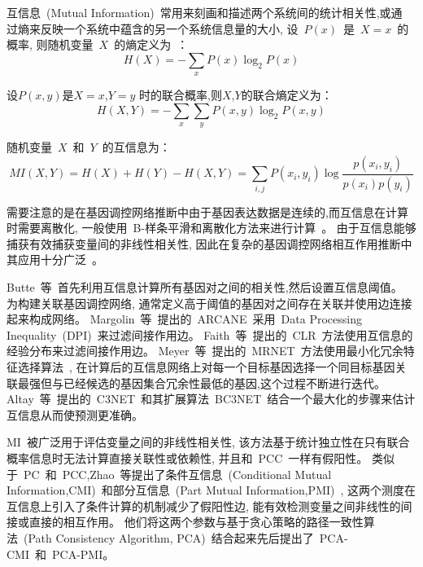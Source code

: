 \begin{enumerate}
互信息~(Mutual Information)~常用来刻画和描述两个系统间的统计相关性,或通
过熵来反映一个系统中蕴含的另一个系统信息量的大小, 设~$P(x)$~是~$X=x$~的概率,
则随机变量~$X$~的熵定义为~\cite{cover2012elements}：
\begin{equation}
H(X) = - \sum\limits_x {P(x)\log _2 P(x)} 
\end{equation}

设$P(x,y)$是$X=x$,$Y=y$ 时的联合概率,则$X$,$Y$的联合熵定义为：
\begin{equation}
H(X,Y) =  - \sum\limits_x {\sum\limits_y {P(x,y)\log _2 P(x,y)} } 
\end{equation}

随机变量~$X$~和~$Y$~的互信息为：
\begin{equation}
MI(X,Y) = H(X) + H(Y) - H(X,Y) = \sum\limits_{i,j} {P(x_i ,y_i )\log \frac{{p(x_i,y_i )}}{{p(x_i )p(y_i )}}} 
\end{equation}

需要注意的是在基因调控网络推断中由于基因表达数据是连续的,而互信息在计算时需要离散化,
一般使用~B-样条平滑和离散化方法来进行计算~\cite{daub2004estimating}。
由于互信息能够捕获有效捕获变量间的非线性相关性,
因此在复杂的基因调控网络相互作用推断中其应用十分广泛~\cite{brunel2010miss,zhang2011inferring}。

Butte~等~\cite{basso2005reverse}首先利用互信息计算所有基因对之间的相关性,然后设置互信息阈值。
为构建关联基因调控网络, 通常定义高于阈值的基因对之间存在关联并使用边连接起来构成网络。
Margolin~等~\cite{margolin2006aracne}提出的~ARCANE~采用~Data Processing Inequality~(DPI)~来过滤间接作用边。
Faith~等~\cite{faith2007large}提出的~CLR~方法使用互信息的经验分布来过滤间接作用边。
Meyer~等~\cite{meyer2007information}提出的~MRNET~方法使用最小化冗余特征选择算法~\cite{peng2005feature},
在计算后的互信息网络上对每一个目标基因选择一个同目标基因关联最强但与已经候选的基因集合冗余性最低的基因,这个过程不断进行迭代。
Altay~等~\cite{altay2010inferring}提出的~C3NET~和其扩展算法~BC3NET~\cite{de2012bagging}结合一个最大化的步骤来估计互信息从而使预测更准确。

MI~被广泛用于评估变量之间的非线性相关性,
该方法基于统计独立性在只有联合概率信息时无法计算直接关联性或依赖性,
并且和~PCC~一样有假阳性\cite{frenzel2007partial,schreiber2000measuring}。
类似于~PC~和~PCC,Zhao~等提出了条件互信息~(Conditional Mutual Information,CMI)~\cite{zhang2011inferring}和部分互信息~(Part Mutual Information,PMI)~\cite{zhao2016part},
这两个测度在互信息上引入了条件计算的机制减少了假阳性边,
能有效检测变量之间非线性的间接或直接的相互作用。
他们将这两个参数与基于贪心策略的路径一致性算法~(Path Consistency Algorithm, PCA)~结合起来先后提出了~PCA-CMI\cite{zhang2011inferring}~和~PCA-PMI\cite{zhao2016part}。
\end{enumerate}

